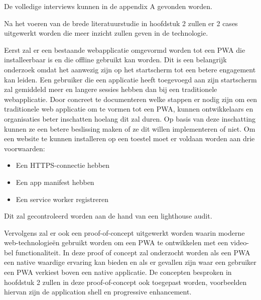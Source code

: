 De volledige interviews kunnen in de appendix A gevonden worden.

Na het voeren van de brede literatuurstudie in hoofdstuk 2 zullen er 2 cases uitgewerkt worden die meer inzicht zullen geven in de technologie.


Eerst zal er een bestaande webapplicatie omgevormd worden tot een PWA die installeerbaar is en die offline gebruikt kan worden.
Dit is een belangrijk onderzoek omdat het aanwezig zijn op het startscherm tot een betere engagement kan leiden. Een gebruiker die een applicatie heeft toegevoegd aan zijn startscherm zal gemiddeld meer en langere sessies hebben dan bij een traditionele webapplicatie.
\autocite{LePage2020b}
Door concreet te documenteren welke stappen er nodig zijn om een traditionele web applicatie om te vormen tot een PWA, kunnen ontwikkelaars en organisaties beter inschatten hoelang dit zal duren.
Op basis van deze inschatting kunnen ze een betere beslissing maken of ze dit willen implementeren of niet.
Om een website te kunnen installeren op een toestel moet er voldaan worden aan drie voorwaarden:
\begin{itemize}
	\item Een HTTPS-connectie hebben
	\item Een app manifest hebben
	\item Een service worker registreren
\end{itemize}
Dit zal gecontroleerd worden aan de hand van een lighthouse audit.
	

Vervolgens zal er ook een proof-of-concept uitgewerkt worden waarin moderne web-technologieën gebruikt worden om een PWA te ontwikkelen met een video-bel functionaliteit. In deze proof of concept zal onderzocht worden als een PWA een native waardige ervaring kan bieden en als er gevallen zijn waar een gebruiker een PWA verkiest boven een native applicatie. De concepten besproken in hoofdstuk 2 zullen in deze proof-of-concept ook toegepast worden, voorbeelden hiervan zijn de application shell en  progressive enhancement.

